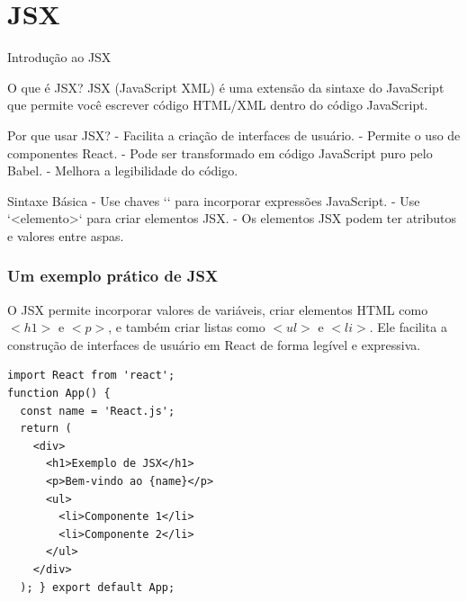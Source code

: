 \documentclass[13pt, xcolor={dvipsnames,svgnames}, portuguese]{beamer}
\begin{document}
\section{JSX}
\begin{frame}{Introdução ao JSX}
  \begin{block}{O que é JSX?}
    JSX (JavaScript XML) é uma extensão da sintaxe do JavaScript que permite você escrever código HTML/XML dentro do código JavaScript.
  \end{block}
  \begin{block}{Por que usar JSX?}
    - Facilita a criação de interfaces de usuário.
    - Permite o uso de componentes React.
    - Pode ser transformado em código JavaScript puro pelo Babel.
    - Melhora a legibilidade do código.
  \end{block}
    \begin{block}{Sintaxe Básica}
    - Use chaves `{}` para incorporar expressões JavaScript.
    - Use `<elemento>` para criar elementos JSX.
    - Os elementos JSX podem ter atributos e valores entre aspas.
  \end{block}
\end{frame}


\begin{frame}[fragile]
\frametitle{Um exemplo prático de JSX}
O JSX permite incorporar valores de variáveis, criar elementos HTML como $<h1>$ e $<p>$, e também criar listas como $<ul>$ e $<li>$. Ele facilita a construção de interfaces de usuário em React de forma legível e expressiva.

\begin{verbatim}
import React from 'react';
function App() {
  const name = 'React.js';
  return (
    <div>
      <h1>Exemplo de JSX</h1>
      <p>Bem-vindo ao {name}</p>
      <ul>
        <li>Componente 1</li>
        <li>Componente 2</li>
      </ul>
    </div>
  ); } export default App;
\end{verbatim}
\end{frame}
\end{document}
